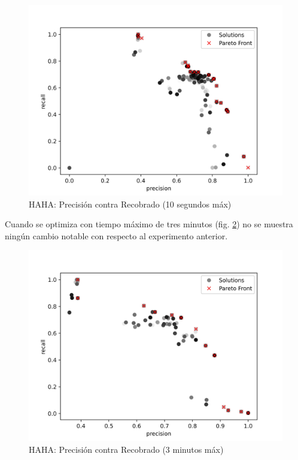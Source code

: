 \begin{figure}[ht]
    \centering
    \includegraphics[scale=0.65]{Pictures/haha_precision_vs_recall.jpg}
    \caption{HAHA: Precisi\'on contra Recobrado (10 segundos m\'ax)}
    \label{impl:fig:haha:precision_vs_recall}
\end{figure}

Cuando se optimiza con tiempo m\'aximo de tres minutos (fig. \ref{impl:fig:haha:precision_vs_recall_3min}) no se muestra ning\'un cambio notable con respecto al experimento anterior. 

\begin{figure}[ht]
    \centering
    \includegraphics[scale=0.65]{Pictures/haha_precision_vs_recall_3min.jpg}
    \caption{HAHA: Precisi\'on contra Recobrado (3 minutos m\'ax)}
    \label{impl:fig:haha:precision_vs_recall_3min}
\end{figure}

